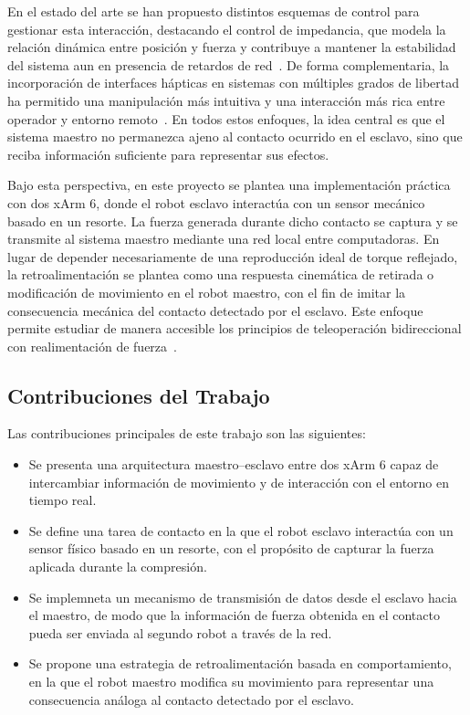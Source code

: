 \documentclass[journal,10pt,twoside]{IEEEtran}
\begin{document}
En el estado del arte se han propuesto distintos esquemas de control para gestionar esta interacción, 
destacando el control de impedancia, que modela la relación dinámica entre posición y fuerza y contribuye a mantener 
la estabilidad del sistema aun en presencia de retardos de red~\cite{postigo2001}. De forma complementaria, 
la incorporación de interfaces hápticas en sistemas con múltiples grados de libertad ha permitido una manipulación 
más intuitiva y una interacción más rica entre operador y entorno remoto~\cite{sanchez2002}. En todos estos 
enfoques, la idea central es que el sistema maestro no permanezca ajeno al contacto ocurrido en el esclavo, 
sino que reciba información suficiente para representar sus efectos.

Bajo esta perspectiva, en este proyecto se plantea una implementación práctica con dos xArm 6, donde el robot 
esclavo interactúa con un sensor mecánico basado en un resorte. La fuerza generada durante dicho contacto se 
captura y se transmite al sistema maestro mediante una red local entre computadoras. En lugar de depender 
necesariamente de una reproducción ideal de torque reflejado, la retroalimentación se plantea como una 
respuesta cinemática de retirada o modificación de movimiento en el robot maestro, con el fin de imitar 
la consecuencia mecánica del contacto detectado por el esclavo. Este enfoque permite estudiar de manera 
accesible los principios de teleoperación bidireccional con realimentación de fuerza~\cite{cardenas2016}.

\subsection{Contribuciones del Trabajo}

Las contribuciones principales de este trabajo son las siguientes:

\begin{itemize}
    \item Se presenta una arquitectura maestro--esclavo entre dos xArm 6 capaz de intercambiar información de movimiento
    y de interacción con el entorno en tiempo real.
    
    \item Se define una tarea de contacto en la que el robot esclavo interactúa con un sensor físico basado en un 
    resorte, con el propósito de capturar la fuerza aplicada durante la compresión.
    
    \item Se implemneta un mecanismo de transmisión de datos desde el esclavo hacia el maestro, de 
    modo que la información de fuerza obtenida en el contacto pueda ser enviada al segundo robot a través de la red.
    
    \item Se propone una estrategia de retroalimentación basada en comportamiento, en la que el robot 
    maestro modifica su movimiento para representar una consecuencia análoga al contacto detectado por el esclavo.
    
    \end{itemize}
      
\end{document}
